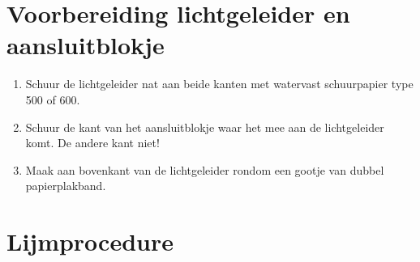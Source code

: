 \section{Voorbereiding lichtgeleider en aansluitblokje}

\begin{enumerate}
    \item Schuur de lichtgeleider nat aan beide kanten met watervast
    schuurpapier type 500 of 600.
    \item Schuur de kant van het aansluitblokje waar het mee aan de
    lichtgeleider komt. De andere kant niet!
    \item Maak aan bovenkant van de lichtgeleider rondom een gootje van
    dubbel papierplakband.
\end{enumerate}


\section{Lijmprocedure}

